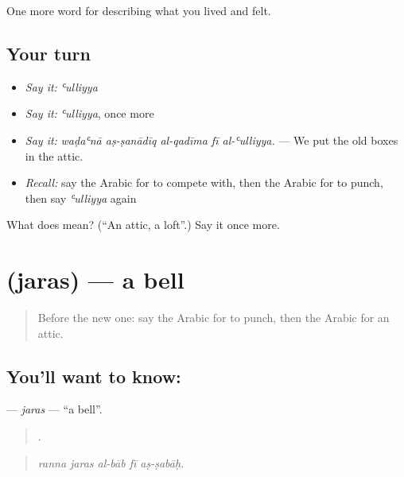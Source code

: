 \begin{grammarlens}[title={What you've built}]
One more word for describing what you lived and felt.
\end{grammarlens}

\subsection*{Your turn}
\begin{itemize}
\raggedright
  \item \emph{Say it:} \emph{ʿulliyya}
  \item \emph{Say it:} \emph{ʿulliyya}, once more
  \item \emph{Say it:} \emph{waḍaʿnā aṣ-ṣanādīq al-qadīma fī al-ʿulliyya.} — We put the old boxes in the attic.
  \item \emph{Recall:} say the Arabic for to compete with, then the Arabic for to punch, then say \emph{ʿulliyya} again
\end{itemize}

\begin{tcolorbox}[breakable,colback=teal!4,colframe=teal!35!black,title={Before you move on}]
What does  mean? (\textquotedblleft{}An attic, a loft\textquotedblright{}.) Say it once more.
\end{tcolorbox}
\section[\texorpdfstring{\ar{جرس} (jaras)}{جرس (jaras)}]{ (jaras) — a bell}

\label{lesson:AR-C549-jaras}



\begin{quote}
Before the new one: say the Arabic for to punch, then the Arabic for an attic.
\end{quote}

\subsection*{You'll want to know: }
\textbf{} — \emph{jaras} — \textquotedblleft{}a bell\textquotedblright{}.

\begin{quote}
    .
\end{quote}

\begin{quote}
\emph{ranna jaras al-bāb fī aṣ-ṣabāḥ.}
\end{quote}

